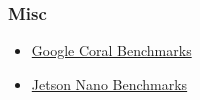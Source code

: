 \documentclass[aspectratio=169]{rubeamer}
\begin{document}
\begin{frame}[allowframebreaks]
  \frametitle{Misc}
  \begin{itemize}
    \item \href{https://coral.ai/docs/edgetpu/benchmarks/}{\color{blue}Google Coral Benchmarks}
    \item \href{https://developer.nvidia.com/embedded/jetson-nano-dl-inference-benchmarks}{\color{blue}Jetson Nano Benchmarks}
  \end{itemize}
  \printbibliography{}
\end{frame}
\end{document}
